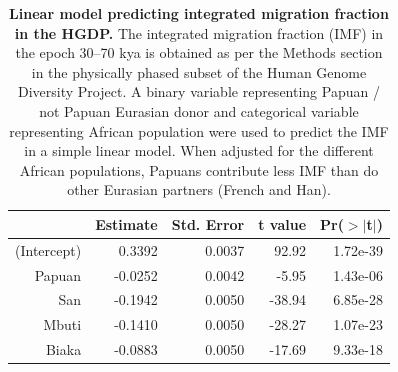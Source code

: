 \documentclass{article}
\begin{document}
\begin{table}[ht]
\centering
\begin{tabular}{rrrrr}
  \hline
 & Estimate & Std. Error & t value & Pr($>$$|$t$|$) \\ 
  \hline
(Intercept) & 0.3392 & 0.0037 & 92.92 & 1.72e-39 \\ 
  Papuan & -0.0252 & 0.0042 & -5.95 & 1.43e-06 \\ 
  San & -0.1942 & 0.0050 & -38.94 & 6.85e-28 \\ 
  Mbuti & -0.1410 & 0.0050 & -28.27 & 1.07e-23 \\ 
  Biaka & -0.0883 & 0.0050 & -17.69 & 9.33e-18 \\ 
   \hline
\end{tabular}
\caption{ {\bf Linear model predicting integrated migration fraction in the HGDP.} The integrated migration fraction (IMF) in the epoch 30--70 kya is obtained as per the Methods section in the physically phased subset of the Human Genome Diversity Project.  A binary variable representing Papuan / not Papuan Eurasian donor and categorical variable representing African population were used to predict the IMF in a simple linear model. When adjusted for the different African populations, Papuans contribute less IMF than do other Eurasian partners (French and Han). } 
\label{hgdp:papuan_imf}
\end{table}
\end{document}
